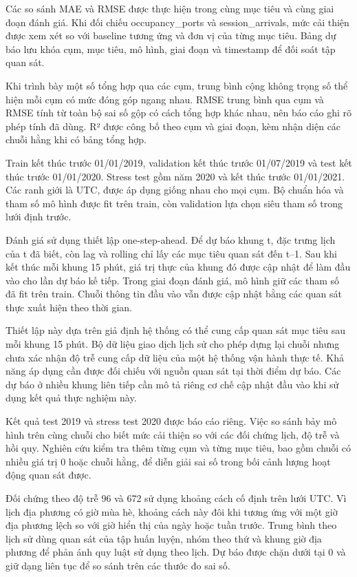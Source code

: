 \documentclass[conference,a4paper]{IEEEtran}
\begin{document}
Các so sánh MAE và RMSE được thực hiện trong cùng mục tiêu và cùng giai đoạn đánh giá. Khi đối chiếu occupancy\_ports và session\_arrivals, mức cải thiện được xem xét so với baseline tương ứng và đơn vị của từng mục tiêu. Bảng dự báo lưu khóa cụm, mục tiêu, mô hình, giai đoạn và timestamp để đối soát tập quan sát.

Khi trình bày một số tổng hợp qua các cụm, trung bình cộng không trọng số thể hiện mỗi cụm có mức đóng góp ngang nhau. RMSE trung bình qua cụm và RMSE tính từ toàn bộ sai số gộp có cách tổng hợp khác nhau, nên báo cáo ghi rõ phép tính đã dùng. R² được công bố theo cụm và giai đoạn, kèm nhận diện các chuỗi hằng khi có bảng tổng hợp.

Train kết thúc trước 01/01/2019, validation kết thúc trước 01/07/2019 và test kết thúc trước 01/01/2020. Stress test gồm năm 2020 và kết thúc trước 01/01/2021. Các ranh giới là UTC, được áp dụng giống nhau cho mọi cụm. Bộ chuẩn hóa và tham số mô hình được fit trên train, còn validation lựa chọn siêu tham số trong lưới định trước.

Đánh giá sử dụng thiết lập one-step-ahead. Để dự báo khung t, đặc trưng lịch của t đã biết, còn lag và rolling chỉ lấy các mục tiêu quan sát đến t–1. Sau khi kết thúc mỗi khung 15 phút, giá trị thực của khung đó được cập nhật để làm đầu vào cho lần dự báo kế tiếp. Trong giai đoạn đánh giá, mô hình giữ các tham số đã fit trên train. Chuỗi thông tin đầu vào vẫn được cập nhật bằng các quan sát thực xuất hiện theo thời gian.

Thiết lập này dựa trên giả định hệ thống có thể cung cấp quan sát mục tiêu sau mỗi khung 15 phút. Bộ dữ liệu giao dịch lịch sử cho phép dựng lại chuỗi nhưng chưa xác nhận độ trễ cung cấp dữ liệu của một hệ thống vận hành thực tế. Khả năng áp dụng cần được đối chiếu với nguồn quan sát tại thời điểm dự báo. Các dự báo ở nhiều khung liên tiếp cần mô tả riêng cơ chế cập nhật đầu vào khi sử dụng kết quả thực nghiệm này.

Kết quả test 2019 và stress test 2020 được báo cáo riêng. Việc so sánh bảy mô hình trên cùng chuỗi cho biết mức cải thiện so với các đối chứng lịch, độ trễ và hồi quy. Nghiên cứu kiểm tra thêm từng cụm và từng mục tiêu, bao gồm chuỗi có nhiều giá trị 0 hoặc chuỗi hằng, để diễn giải sai số trong bối cảnh lượng hoạt động quan sát được.

Đối chứng theo độ trễ 96 và 672 sử dụng khoảng cách cố định trên lưới UTC. Vì lịch địa phương có giờ mùa hè, khoảng cách này đôi khi tương ứng với một giờ địa phương lệch so với giờ hiển thị của ngày hoặc tuần trước. Trung bình theo lịch sử dùng quan sát của tập huấn luyện, nhóm theo thứ và khung giờ địa phương để phản ánh quy luật sử dụng theo lịch. Dự báo được chặn dưới tại 0 và giữ dạng liên tục để so sánh trên các thước đo sai số.
\end{document}
